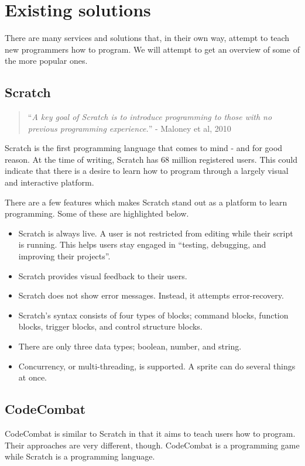 \section{Existing solutions}\label{sec:existing_solutions}
There are many services and solutions that, in their own way, attempt to teach new programmers how to program.
We will attempt to get an overview of some of the more popular ones.

\subsection{Scratch}\label{ScratchSection}
\begin{quote}
    ``\emph{A key goal of Scratch is to introduce programming to those with no previous programming experience.}'' - Maloney et al, 2010\cite{maloneyScratchProgrammingLanguage2010}
\end{quote}

Scratch\cite{ScratchImagineProgram} is the first programming language that comes to mind - and for good reason. At the time of writing, Scratch has 68 million registered users\cite{ScratchImagineProgramStatistics}. This could indicate that there is a desire to learn how to program through a largely visual and interactive platform.

There are a few features which makes Scratch stand out as a platform to learn programming. Some of these are highlighted below.
\begin{itemize}
    \item Scratch is always live. A user is not restricted from editing while their script is running. This helps users stay engaged in ``testing, debugging, and improving their projects''.
    \item Scratch provides visual feedback to their users.
    \item Scratch does not show error messages. Instead, it attempts error-recovery.
    \item Scratch's syntax consists of four types of blocks; command blocks, function blocks, trigger blocks, and control structure blocks.
    \item There are only three data types; boolean, number, and string.
    \item Concurrency, or multi-threading, is supported. A sprite can do several things at once.
\end{itemize}\cite{maloneyScratchProgrammingLanguage2010}

\subsection{CodeCombat}\label{CodeCombatSection}
CodeCombat\cite{CodeCombatCodingGames} is similar to Scratch in that it aims to teach users how to program.
Their approaches are very different, though. CodeCombat is a programming game while Scratch is a programming language.

